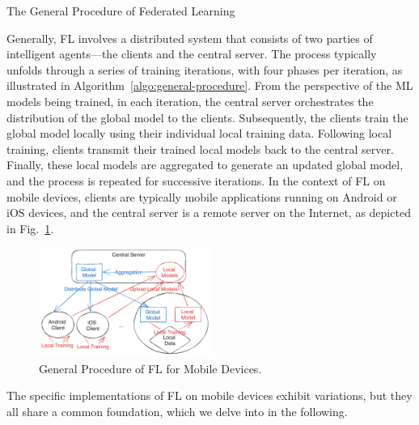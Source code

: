 \documentclass[conference]{IEEEtran}
\begin{document}
\label{sec:general-procedure}

\begin{algorithm}
  \caption{The General Procedure of Federated Learning}
  \label{algo:general-procedure}
\end{algorithm}

Generally, FL involves a distributed system that
consists of two parties of intelligent agents—the
clients and the central server.
The process typically unfolds through a series of training iterations,
with four phases per iteration,
as illustrated in Algorithm~\ref{algo:general-procedure}.
From the perspective of the ML models being trained,
in each iteration,
the central server orchestrates the distribution of the global model
to the clients.
Subsequently, the clients train the global model locally using
their individual local training data.
Following local training,
clients transmit their trained local models back to the central server.
Finally, these local models are aggregated to generate an updated global model,
and the process is repeated for successive iterations.
In the context of FL on mobile devices,
clients are typically mobile applications running on Android or iOS devices,
and the central server is a remote server on the Internet,
as depicted in Fig.~\ref{fig:general-fl}.

\begin{figure}
\centerline{
    \includegraphics[width=0.5\textwidth]{general-fl.png}
}
\caption{General Procedure of FL for Mobile Devices.}
\label{fig:general-fl}
\end{figure}

The specific implementations of FL on mobile devices exhibit variations,
but they all share a common foundation,
which we delve into in the following.
\end{document}
